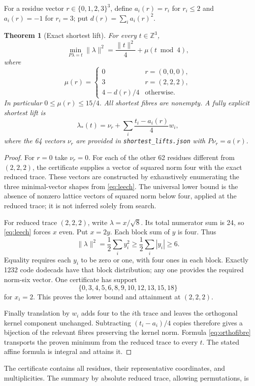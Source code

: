 \documentclass[11pt,reqno]{amsart}
\newtheorem{theorem}{Theorem}[section]
\theoremstyle{definition}\newtheorem{definition}[theorem]{Definition}
\theoremstyle{remark}\newtheorem{remark}[theorem]{Remark}
\newcommand{\Z}{\mathbb Z}\newcommand{\Q}{\mathbb Q}\newcommand{\R}{\mathbb R}\newcommand{\F}{\mathbb F}
\begin{document}
For a residue vector $r\in\{0,1,2,3\}^3$, define $a_i(r)=r_i$ for $r_i\le2$ and $a_i(r)=-1$ for $r_i=3$; put $d(r)=\sum_i a_i(r)^2$.
\begin{theorem}[Exact shortest lift]\label{thm:shortest}
For every $t\in\Z^3$,
\begin{equation}\label{eq:height}
\min_{P\lambda=t}\|\lambda\|^2=\frac{\|t\|^2}{4}+\mu(t\bmod4),
\end{equation}
where
\[
\mu(r)=\begin{cases}
0&r=(0,0,0),\\
3&r=(2,2,2),\\
4-d(r)/4&\text{otherwise}.
\end{cases}
\]
In particular $0\le\mu(r)\le15/4$. All shortest fibres are nonempty. A fully explicit shortest lift is
\[
\lambda_*(t)=\nu_r+\sum_i\frac{t_i-a_i(r)}4w_i,
\]
where the 64 vectors $\nu_r$ are provided in \texttt{shortest\_lifts.json} with $P\nu_r=a(r)$.
\end{theorem}
\begin{proof}
For $r=0$ take $\nu_r=0$. For each of the other 62 residues different from $(2,2,2)$, the certificate supplies a vector of squared norm four with the exact reduced trace. These vectors are constructed by exhaustively enumerating the three minimal-vector shapes from \eqref{eq:leech}. The universal lower bound is the absence of nonzero lattice vectors of squared norm below four, applied at the reduced trace; it is not inferred solely from search.

For reduced trace $(2,2,2)$, write $\lambda=x/\sqrt8$. Its total numerator sum is 24, so \eqref{eq:leech} forces $x$ even. Put $x=2y$. Each block sum of $y$ is four. Thus
\[
\|\lambda\|^2=\frac12\sum_i y_i^2\ge\frac12\sum_i|y_i|\ge6.
\]
Equality requires each $y_i$ to be zero or one, with four ones in each block. Exactly 1232 code dodecads have that block distribution; any one provides the required norm-six vector. One certificate has support
\[
\{0,3,4,5,6,8,9,10,12,13,15,18\}
\]
for $x_i=2$. This proves the lower bound and attainment at $(2,2,2)$.

Finally translation by $w_i$ adds four to the $i$th trace and leaves the orthogonal kernel component unchanged. Subtracting $(t_i-a_i)/4$ copies therefore gives a bijection of the relevant fibres preserving the kernel norm. Formula \eqref{eq:orthofibre} transports the proven minimum from the reduced trace to every $t$. The stated affine formula is integral and attains it.
\end{proof}
The certificate contains all residues, their representative coordinates, and multiplicities. The summary by absolute reduced trace, allowing permutations, is
\end{document}
